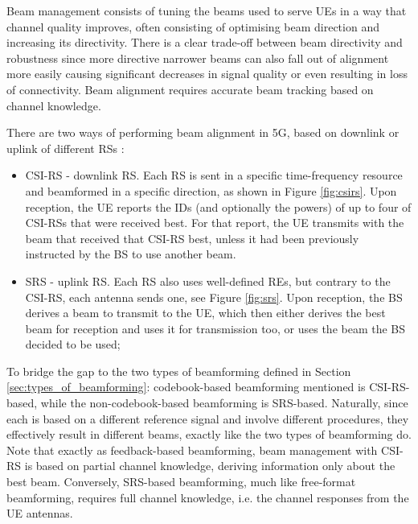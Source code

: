 Beam management consists of tuning the beams used to serve UEs in a way that channel quality improves, often consisting of optimising beam direction and increasing its directivity. There is a clear trade-off between beam directivity and robustness since more directive narrower beams can also fall out of alignment more easily causing significant decreases in signal quality or even resulting in loss of connectivity. Beam alignment requires accurate beam tracking based on channel knowledge.

There are two ways of performing beam alignment in \ac{5G}, based on downlink or uplink of different \acp{RS} \cite{8947954}: 


\begin{itemize}
    \item \ac{CSI-RS} - downlink \ac{RS}. Each RS is sent in a specific time-frequency resource and beamformed in a specific direction, as shown in Figure \ref{fig:csirs}. Upon reception, the UE reports the IDs (and optionally the powers) of up to four of CSI-RSs that were received best. For that report, the UE transmits with the beam that received that CSI-RS best, unless it had been previously instructed by the BS to use another beam. 
    \item \ac{SRS} - uplink \ac{RS}. Each RS also uses well-defined \acsp{RE}, but contrary to the \acs{CSI-RS}, each antenna sends one, see Figure \ref{fig:srs}. Upon reception, the BS derives a beam to transmit to the UE, which then either derives the best beam for reception and uses it for transmission too, or uses the beam the BS decided to be used;
\end{itemize}


To bridge the gap to the two types of beamforming defined in Section \ref{sec:types_of_beamforming}: codebook-based beamforming mentioned is CSI-RS-based, while the non-codebook-based beamforming is SRS-based. Naturally, since each is based on a different reference signal and involve different procedures, they effectively result in different beams, exactly like the two types of beamforming do. Note that exactly as feedback-based beamforming, beam management with CSI-RS is based on partial channel knowledge, deriving information only about the best beam. Conversely, SRS-based beamforming, much like free-format beamforming, requires full channel knowledge, i.e. the channel responses from the \ac{UE} antennas.

